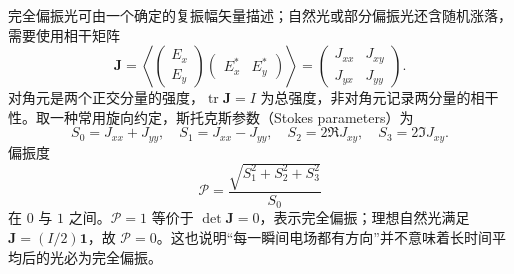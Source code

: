 完全偏振光可由一个确定的复振幅矢量描述；自然光或部分偏振光还含随机涨落，需要使用相干矩阵
\begin{equation}
 \mathbf J=
 \left\langle
 \begin{pmatrix}E_x\\E_y\end{pmatrix}
 \begin{pmatrix}E_x^*&E_y^*\end{pmatrix}
 \right\rangle
 =\begin{pmatrix}J_{xx}&J_{xy}\\J_{yx}&J_{yy}\end{pmatrix}.
\end{equation}
对角元是两个正交分量的强度，$\operatorname{tr}\mathbf J=I$ 为总强度，非对角元记录两分量的相干性。取一种常用旋向约定，斯托克斯参数（Stokes parameters）为
\begin{equation}
 S_0=J_{xx}+J_{yy},\quad S_1=J_{xx}-J_{yy},\quad
 S_2=2\Re J_{xy},\quad S_3=2\Im J_{xy}.
\end{equation}
偏振度
\begin{equation}
 \mathcal P=\frac{\sqrt{S_1^2+S_2^2+S_3^2}}{S_0}
\end{equation}
在 $0$ 与 $1$ 之间。$\mathcal P=1$ 等价于 $\det\mathbf J=0$，表示完全偏振；理想自然光满足 $\mathbf J=(I/2)\mathbf 1$，故 $\mathcal P=0$。这也说明“每一瞬间电场都有方向”并不意味着长时间平均后的光必为完全偏振。




\endgroup